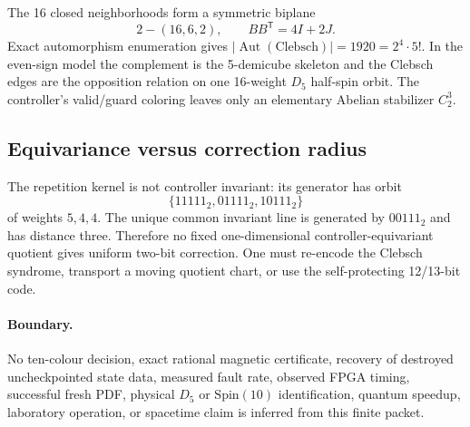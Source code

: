 The 16 closed neighborhoods form a symmetric biplane
\[
 \boxed{2-(16,6,2)},
 \qquad B B^{\mathsf T}=4I+2J.
\]
Exact automorphism enumeration gives
\(|\operatorname{Aut}(\mathrm{Clebsch})|=1920=2^4\cdot5!\).  In the even-sign
model the complement is the 5-demicube skeleton and the Clebsch edges are the
opposition relation on one 16-weight \(D_5\) half-spin orbit.  The controller's
valid/guard coloring leaves only an elementary Abelian stabilizer \(C_2^3\).

\subsection{Equivariance versus correction radius}
The repetition kernel is not controller invariant: its generator has orbit
\[
 \{11111_2,01111_2,10111_2\}
\]
of weights \(5,4,4\).  The unique common invariant line is generated by
\(00111_2\) and has distance three.  Therefore no fixed one-dimensional
controller-equivariant quotient gives uniform two-bit correction.  One must
re-encode the Clebsch syndrome, transport a moving quotient chart, or use the
self-protecting 12/13-bit code.

\paragraph{Boundary.}
No ten-colour decision, exact rational magnetic certificate, recovery of destroyed uncheckpointed state data, measured fault
rate, observed FPGA timing, successful fresh PDF, physical \(D_5\) or
\(\mathrm{Spin}(10)\) identification, quantum speedup, laboratory operation, or
spacetime claim is inferred from this finite packet.
